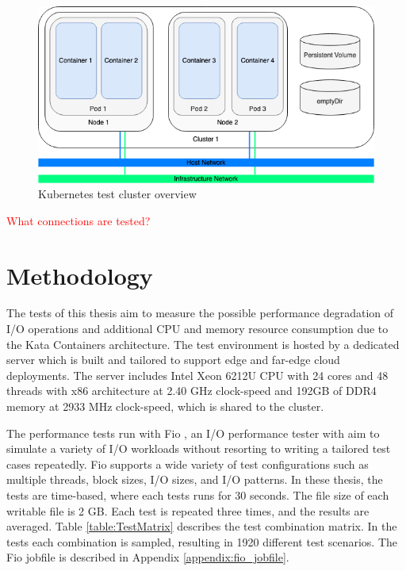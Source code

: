 \begin{figure}[ht]
  \begin{center}
    \includegraphics[width=13.5cm]{images/TestArchitectureCluster.png}
    \caption{Kubernetes test cluster overview}
    \label{fig:TestArchitectureCluster}
  \end{center}
\end{figure}

\textcolor{red}{What connections are tested?}

\section{Methodology}

The tests of this thesis aim to measure the possible performance degradation of I/O operations and additional CPU and memory resource consumption due to the Kata Containers architecture. The test environment is hosted by a dedicated server which is built and tailored to support edge and far-edge cloud deployments. The server includes Intel Xeon 6212U CPU with 24 cores and 48 threads with x86 architecture at 2.40 GHz clock-speed and 192GB of DDR4 memory at 2933 MHz clock-speed, which is shared to the cluster.

The performance tests run with Fio \cite{FIO}, an I/O performance tester with aim to simulate a variety of I/O workloads without resorting to writing a tailored test cases repeatedly. Fio supports a wide variety of test configurations such as multiple threads, block sizes, I/O sizes, and I/O patterns. In these thesis, the tests are time-based, where each tests runs for 30 seconds. The file size of each writable file is 2 GB. Each test is repeated three times, and the results are averaged. Table \ref{table:TestMatrix} describes the test combination matrix. In the tests each combination is sampled, resulting in 1920 different test scenarios. The Fio jobfile is described in Appendix \ref{appendix:fio_jobfile}.

